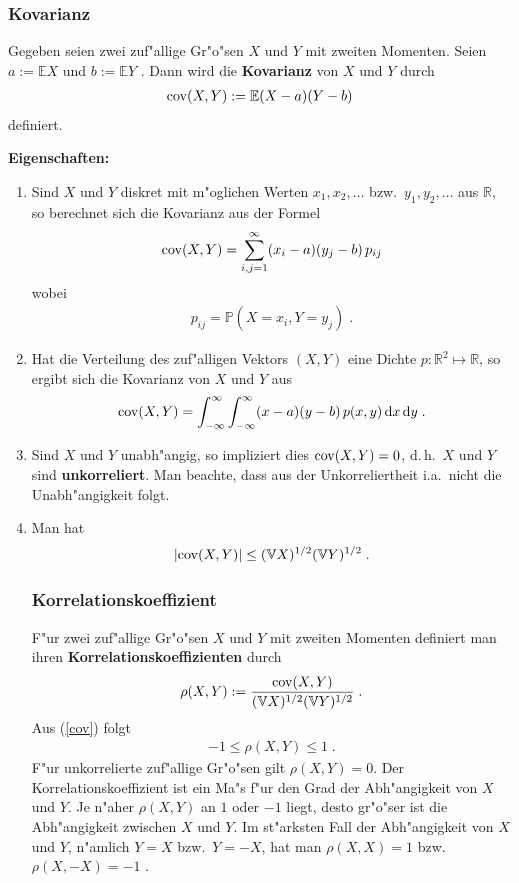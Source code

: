 \documentclass[ngerman,draft,parskip=half,twoside]{scrartcl}
\newcommand*{\R}{\mathbb{R}}      %
\newcommand*{\E}{\mathbb{E}}        %
\newcommand*{\V}{\mathbb{V}}        %
\newcommand*{\WKM}{\mathbb{P}}      %
\begin{document}
\subsubsection{Kovarianz}
Gegeben seien zwei zuf"allige Gr"o"sen $X$ und $Y$ mit zweiten Momenten.
Seien $a:=\E X$ und $b:=\E Y$ . Dann wird die \textbf{Kovarianz} von $X$ und $Y$ durch
\begin{gather*}
  {\rm  cov}(X,Y):= \E(X-a)(Y-b)
\end{gather*}
definiert.

\textbf{Eigenschaften:}

\begin{enumerate}
\item
Sind $X$ und $Y$ diskret mit m"oglichen Werten $x_1,x_2,\ldots$ bzw.~$y_1,y_2,\ldots$ aus $\R$,
so berechnet sich die Kovarianz aus der Formel
  \begin{gather*}
    {\rm  cov}(X,Y)=\sum_{i,j=1}^\infty (x_i-a)(y_j-b)\, p_{ij}
  \end{gather*}
wobei
  \begin{gather*}
    p_{ij}=\WKM(X=x_i, Y=y_j)\;.
  \end{gather*}
\item
Hat die Verteilung des zuf"alligen Vektors $(X,Y)$ eine Dichte $p \colon\R^2\mapsto\R$, so
ergibt sich die Kovarianz von $X$ und $Y$ aus
  \begin{gather*}
    {\rm  cov}(X,Y)=\int_{-\infty}^\infty \int_{-\infty}^\infty (x-a)(y-b)\,p(x,y)\,\mathrm d x\, \mathrm d y\;.
  \end{gather*}
\item
Sind $X$ und $Y$ unabh"angig, so impliziert dies ${\rm  cov}(X,Y)=0$, d.\,h.~$X$ und $Y$ sind
\textbf{unkorreliert}. Man beachte, dass aus der Unkorreliertheit i.a.~nicht die Unabh"angigkeit folgt.
\item
Man hat
\begin{gather}
\label{cov}
|{\rm  cov}(X,Y)|\le (\V X)^{1/2}(\V Y)^{1/2}\;.
\end{gather}
\subsubsection{Korrelationskoeffizient}
F"ur zwei zuf"allige Gr"o"sen $X$ und $Y$ mit zweiten Momenten definiert man ihren
\textbf{Korrelationskoeffizienten} durch
  \begin{gather*}
    \rho(X,Y):=\frac{{\rm  cov}(X,Y)}{(\V X)^{1/2}(\V Y)^{1/2}}\;.
  \end{gather*}
Aus (\ref{cov}) folgt
  \begin{gather*}
    -1\le \rho(X,Y)\le 1\;.
  \end{gather*}
F"ur unkorrelierte zuf"allige Gr"o"sen gilt $\rho(X,Y)=0$.
 Der Korrelationskoeffizient ist ein Ma"s f"ur den Grad der Abh"angigkeit von
$X$ und $Y$. Je n"aher $\rho(X,Y)$ an $1$ oder $-1$ liegt, desto gr"o"ser ist die
Abh"angigkeit zwischen $X$ und $Y$. Im st"arksten Fall
der Abh"angigkeit von $X$ und $Y$, n"amlich $Y=X$ bzw.~$Y=-X$, hat man $\rho(X,X)=1$ bzw.~$\rho(X,-X)=-1$ .
\end{enumerate}
\end{document}
